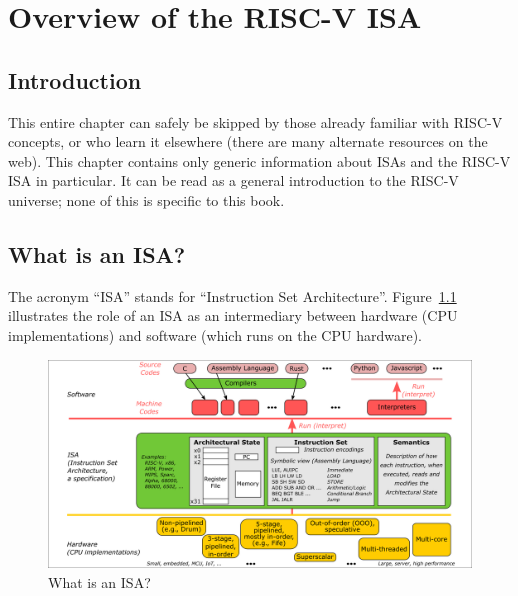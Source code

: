 

\chapter{Overview of the RISC-V ISA}



\setcounter{page}{1}
\renewcommand{\thepage}{\arabic{chapter}-\arabic{page}}

\label{ch_ISA}


\section{Introduction}

This entire chapter can safely be skipped by those already familiar
with RISC-V concepts, or who learn it elsewhere (there are many
alternate resources on the web).  This chapter contains only generic
information about ISAs and the RISC-V ISA in particular.  It can be
read as a general introduction to the RISC-V universe; none of this is
specific to this book.


\section{What is an ISA?}


The acronym ``ISA'' stands for ``Instruction Set Architecture''.
Figure~\ref{Fig_What_is_an_ISA} illustrates the role of an ISA as an
intermediary between hardware (CPU implementations) and software
(which runs on the CPU hardware).
\begin{figure}[htbp]
  \centerline{\includegraphics[width=6in,angle=0]{Figures/Fig_What_is_an_ISA}}
  \caption{\label{Fig_What_is_an_ISA} What is an ISA?}
\end{figure}

